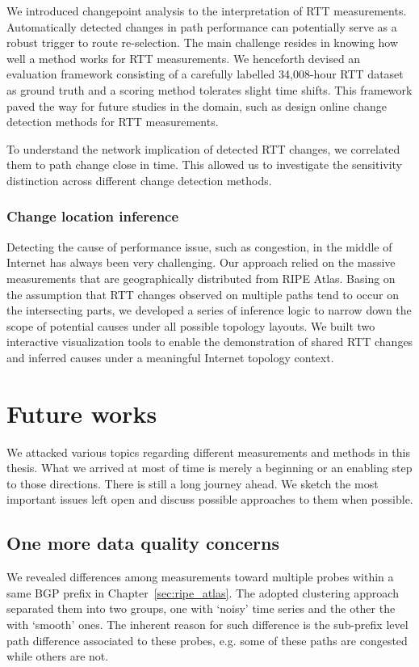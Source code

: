 We introduced changepoint analysis to the interpretation of RTT measurements.
Automatically detected changes in path performance can potentially serve as a robust trigger to route re-selection.
The main challenge resides in knowing how well a method works for RTT measurements.
We henceforth devised an evaluation framework consisting of a carefully labelled 34,008-hour RTT dataset as ground truth and a scoring method tolerates slight time shifts. This framework paved the way for future studies in the domain, such as design online change detection methods for RTT measurements.

To understand the network implication of detected RTT changes, we correlated them to path change close in time.
This allowed us to investigate the sensitivity distinction across different change detection methods.

\subsection{Change location inference}
Detecting the cause of performance issue, such as congestion, in the middle of Internet has always been very challenging. 
Our approach relied on the massive measurements that are geographically distributed from RIPE Atlas. Basing on the assumption that RTT changes observed on multiple paths tend to occur on the intersecting parts, we developed a series of inference logic to narrow down the scope of potential causes under all possible topology layouts.
We built two interactive visualization tools to enable the demonstration of shared RTT changes and inferred causes under a meaningful Internet topology context.


\chapter{Future works}
We attacked various topics regarding different measurements and methods in this thesis.
What we arrived at most of time is merely a beginning or an enabling step to those directions.
There is still a long journey ahead.
We sketch the most important issues left open and discuss possible approaches to them when possible.

\iffalse
\section{One more data quality concerns}
We revealed differences among measurements toward multiple probes within a same BGP prefix in Chapter~\ref{sec:ripe_atlas}. The adopted clustering approach separated them into two groups, one with `noisy' time series and the other the with `smooth' ones. The inherent reason for such difference is the sub-prefix level path difference associated to these probes, e.g. some of these paths are congested while others are not.

